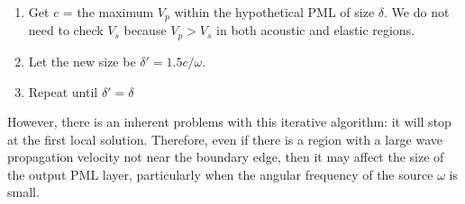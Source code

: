 \begin{enumerate}
\item Get $c$ = the maximum $V_p$ within the hypothetical PML of size $\delta$. We do not need to check $V_s$ because $V_p > V_s$ in both acoustic and elastic regions.
\item Let the new size be $\delta' = 1.5 c / \omega$.
\item Repeat until $\delta' = \delta$
\end{enumerate}


However, there is an inherent problems with this iterative algorithm: it will stop at the first local solution. Therefore, even if there is a region with a large wave propagation velocity
not near the boundary edge, then it may affect the size of the output PML layer, particularly when the angular frequency of the source $\omega$ is small. 

